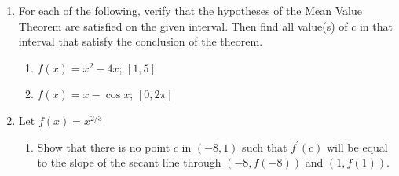 \documentclass[12pt]{article}
\newif\ifans
\begin{document}
\begin{enumerate}
\begin{enumerate}
\end{enumerate}

\item For each of the following, verify that the hypotheses of the Mean Value Theorem are satisfied on the given interval. Then find all value(s) of $c$ in that interval that satisfy the conclusion of the theorem.

\begin{enumerate}

\item $f(x)=x^2-4x$; $[1,5]$

\ifans{\fbox{\parbox{1\linewidth}{$f(x)$ is a polynomial; so, it is continuous and differentiable everywhere on $(-\infty,\infty)$.  In particular, it is continuous on $[1,5]$ and differentiable on $(1,5)$.  Thus, all of the hypotheses of the Mean Value Theorem are satisfied and there exists a $c$ in $(1,5)$ with $f^{\prime}(c)=\frac{f(5)-f(1)}{5-1}$.  In particular, $c=3$.}}}\fi

\item $f(x)=x-\cos{x}$; $[0,2\pi]$

\ifans{\fbox{\parbox{1\linewidth}{$x$ is a polynomial and is, therefore, continuous and differentiable everywhere on $(-\infty,\infty)$.  $\cos{x}$ is also continuous and differentiable everywhere on $(-\infty,\infty)$.  So, since the difference of continuous functions is continuous and the difference of differentiable functions is differentiable, we have that $f(x)$  is continuous and differentiable everywhere on $(-\infty,\infty)$.  In particular, it is continuous on $[0,2\pi]$ and differentiable on $(0,2\pi)$.  Thus, all of the hypotheses of the Mean Value Theorem are satisfied and there exists a $c$ in $(0,2\pi)$ with $f^{\prime}(c)=\frac{f(2\pi)-f(0)}{2\pi-0}$.  In particular, $c=\pi$.}}}\fi

\end{enumerate}

\item Let $f(x)=x^{2/3}$

\begin{enumerate}

\item Show that there is no point $c$ in $(-8,1)$ such that $f^{\prime}(c)$ will be equal to the slope of the secant line through $(-8,f(-8))$ and $(1,f(1))$.

\ifans{\fbox{\parbox{1\linewidth}{It can be shown that the slope of the secant line which passes through $(-8,f(-8))$ and $(1,f(1))$ is $-\frac{1}{3}$.  And, $f^{\prime}(x)=\frac{2}{3x^{1/3}}$.  However, the only solution to $f^{\prime}(x)=-\frac{1}{3}$ is $-8$, which is not in $(-8,1)$.}}}\fi


\end{enumerate}
\end{enumerate}
\end{document}
